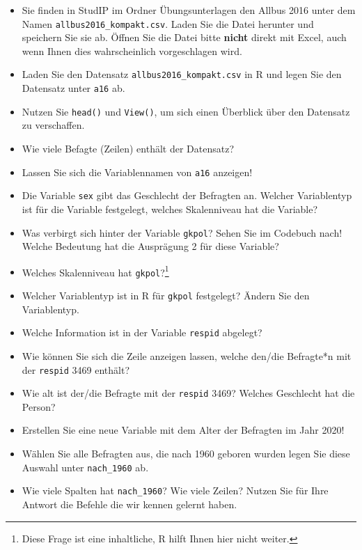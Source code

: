\documentclass[
  letterpaper,
  DIV=11,
  numbers=noendperiod]{scrreprt}
\begin{document}
\begin{itemize}
\item
  Sie finden in StudIP im Ordner Übungsunterlagen den Allbus 2016 unter
  dem Namen \texttt{allbus2016\_kompakt.csv}. Laden Sie die Datei
  herunter und speichern Sie sie ab. Öffnen Sie die Datei bitte
  \textbf{nicht} direkt mit Excel, auch wenn Ihnen dies wahrscheinlich
  vorgeschlagen wird.
\item
  Laden Sie den Datensatz \texttt{allbus2016\_kompakt.csv} in R und
  legen Sie den Datensatz unter \texttt{a16} ab.
\item
  Nutzen Sie \texttt{head()} und \texttt{View()}, um sich einen
  Überblick über den Datensatz zu verschaffen.
\item
  Wie viele Befagte (Zeilen) enthält der Datensatz?
\item
  Lassen Sie sich die Variablennamen von \texttt{a16} anzeigen!
\item
  Die Variable \texttt{sex} gibt das Geschlecht der Befragten an.
  Welcher Variablentyp ist für die Variable festgelegt, welches
  Skalenniveau hat die Variable?
\item
  Was verbirgt sich hinter der Variable \texttt{gkpol}? Sehen Sie im
  Codebuch nach! Welche Bedeutung hat die Ausprägung 2 für diese
  Variable?
\item
  Welches Skalenniveau hat \texttt{gkpol}?\footnote{Diese Frage ist eine
    inhaltliche, R hilft Ihnen hier nicht weiter.}
\item
  Welcher Variablentyp ist in R für \texttt{gkpol} festgelegt? Ändern
  Sie den Variablentyp.
\item
  Welche Information ist in der Variable \texttt{respid} abgelegt?
\item
  Wie können Sie sich die Zeile anzeigen lassen, welche den/die
  Befragte*n mit der \texttt{respid} 3469 enthält?
\item
  Wie alt ist der/die Befragte mit der \texttt{respid} 3469? Welches
  Geschlecht hat die Person?
\item
  Erstellen Sie eine neue Variable mit dem Alter der Befragten im Jahr
  2020!
\item
  Wählen Sie alle Befragten aus, die nach 1960 geboren wurden legen Sie
  diese Auswahl unter \texttt{nach\_1960} ab.
\item
  Wie viele Spalten hat \texttt{nach\_1960}? Wie viele Zeilen? Nutzen
  Sie für Ihre Antwort die Befehle die wir kennen gelernt haben.
\end{itemize}
\end{document}
